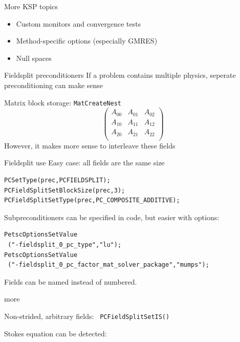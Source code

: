\begin{longstory}
\begin{shortversion}
\begin{numberedframe}{More KSP topics}
  \begin{itemize}
  \item Custom monitors and convergence tests
  \item Method-specific options (especially GMRES)
  \item Null spaces
  \end{itemize}
\end{numberedframe}

\end{shortversion}

\begin{numberedframe}{Fieldsplit preconditioners}
If a problem contains multiple physics, seperate preconditioning can
make sense

Matrix block storage: \lstinline{MatCreateNest}
\[ 
\begin{pmatrix}
  A_{00}&A_{01}&A_{02}\\ A_{10}&A_{11}&A_{12}\\ A_{20}&A_{21}&A_{22}\\ 
\end{pmatrix}
\]
However, it makes more sense to interleave these fields
\end{numberedframe}

\begin{numberedframe}{Fieldsplit use}
Easy case: all fields are the same size
\begin{lstlisting}
PCSetType(prec,PCFIELDSPLIT);
PCFieldSplitSetBlockSize(prec,3);
PCFieldSplitSetType(prec,PC_COMPOSITE_ADDITIVE);
\end{lstlisting}
Subpreconditioners can be specified in code, but easier with options:
\begin{lstlisting}
PetscOptionsSetValue
 ("-fieldsplit_0_pc_type","lu");
PetscOptionsSetValue
 ("-fieldsplit_0_pc_factor_mat_solver_package","mumps");
\end{lstlisting}
Fields can be named instead of numbered.
\end{numberedframe}

\begin{numberedframe}{more}

Non-strided, arbitrary fields: \lstinline{ PCFieldSplitSetIS()}

Stokes equation can be detected:


\end{numberedframe}
\end{longstory}
